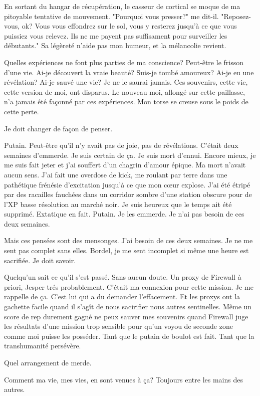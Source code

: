 En sortant du hangar de récupération, le casseur de cortical se moque de ma pitoyable tentative de mouvement. "Pourquoi vous presser?" me dit-il. "Reposez-vous, ok? Vous vous effondrez sur le sol, vous y resterez jusqu'à ce que vous puissiez vous relevez. Ils ne me payent pas suffisament pour surveiller les débutants."  Sa légèreté n'aide pas mon humeur, et la mélancolie revient. 

Quelles expériences ne font plus parties de ma conscience? Peut-être le frisson d'une vie. Ai-je découvert la vraie beauté? Suis-je tombé amoureux? Ai-je eu une révélation? Ai-je sauvé une vie? Je ne le saurai jamais. Ces souvenirs, cette vie, cette version de moi, ont disparus. Le nouveau moi, allongé sur cette paillasse, n'a jamais été façonné par ces expériences. Mon torse se creuse sous le poids de cette perte. 

Je doit changer de façon de penser. 

Putain. Peut-être qu'il n'y avait pas de joie, pas de révélations. C'était deux semaines d'emmerde. Je suis certain de ça. Je suis mort d'ennui. Encore mieux, je me suis fait jeter et j'ai souffert d'un chagrin d'amour épique. Ma mort n'avait aucun sens. J'ai fait une overdose de kick, me roulant par terre dans une pathétique frénésie d'excitation jusqu'à ce que mon cœur explose. J'ai été étripé par des racailles fauchées dans un corridor sombre d'une station obscure pour de l'XP basse résolution au marché noir. Je suis heureux que le temps ait été supprimé. Extatique en fait. Putain. Je les emmerde. Je n'ai pas besoin de ces deux semaines. 

Mais ces pensées sont des mensonges. J'ai besoin de ces deux semaines. Je ne me sent pas complet sans elles. Bordel, je me sent incomplet si même une heure est sacrifiée. Je doit savoir. 

Quelqu'un sait ce qu'il s'est passé. Sans aucun doute. Un proxy de Firewall à priori, Jesper trés probablement. C'était ma connexion pour cette mission. Je me rappelle de ça. C'est lui qui a du demander l'effacement. Et les proxys ont la gachette facile quand il s'agît de nous sacirifier nous autres sentinelles. Même un score de rep durement gagné ne peux sauver mes souvenirs quand Firewall juge les résultats d'une mission trop sensible pour qu'un voyou de seconde zone comme moi puisse les posséder. Tant que le putain de boulot est fait. Tant que la transhumanité persévère. 

Quel arrangement de merde. 

Comment ma vie, mes vies, en sont venues à ça? Toujours entre les mains des autres. 

